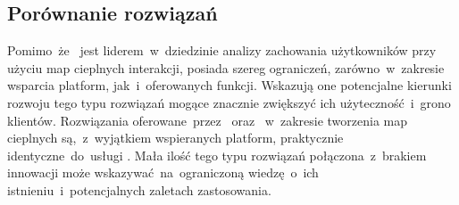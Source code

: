 \subsection{Porównanie rozwiązań}
Pomimo~że~ jest liderem~w~dziedzinie analizy zachowania użytkowników przy użyciu map cieplnych interakcji, posiada szereg ograniczeń, zarówno~w~zakresie wsparcia platform, jak~i~oferowanych funkcji. Wskazują one potencjalne kierunki rozwoju tego typu rozwiązań mogące znacznie zwiększyć ich użyteczność~i~grono klientów. Rozwiązania oferowane~przez~ oraz ~w~zakresie tworzenia map cieplnych są,~z~wyjątkiem wspieranych platform, praktycznie identyczne~do~usługi .  Mała ilość tego typu rozwiązań połączona~z~brakiem innowacji może wskazywać~na~ograniczoną wiedzę~o~ich istnieniu~i~potencjalnych zaletach zastosowania.
